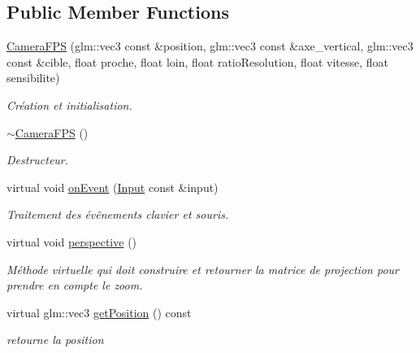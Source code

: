 \subsection*{Public Member Functions}
\begin{DoxyCompactItemize}
\item 
\hypertarget{classCameraFPS_a052e711986b70b0f34fb85f72c6818c9}{\hyperlink{classCameraFPS_a052e711986b70b0f34fb85f72c6818c9}{Camera\+F\+P\+S} (glm\+::vec3 const \&position, glm\+::vec3 const \&axe\+\_\+vertical, glm\+::vec3 const \&cible, float proche, float loin, float ratio\+Resolution, float vitesse, float sensibilite)}\label{classCameraFPS_a052e711986b70b0f34fb85f72c6818c9}

\begin{DoxyCompactList}\small\item\em Création et initialisation. \end{DoxyCompactList}\item 
\hypertarget{classCameraFPS_a2cf832c958d3e5a630539ea864b484dd}{\hyperlink{classCameraFPS_a2cf832c958d3e5a630539ea864b484dd}{$\sim$\+Camera\+F\+P\+S} ()}\label{classCameraFPS_a2cf832c958d3e5a630539ea864b484dd}

\begin{DoxyCompactList}\small\item\em Destructeur. \end{DoxyCompactList}\item 
\hypertarget{classCameraFPS_a1a051bc9f334ec12dc43fa16f6dd204c}{virtual void \hyperlink{classCameraFPS_a1a051bc9f334ec12dc43fa16f6dd204c}{on\+Event} (\hyperlink{classInput}{Input} const \&input)}\label{classCameraFPS_a1a051bc9f334ec12dc43fa16f6dd204c}

\begin{DoxyCompactList}\small\item\em Traitement des évênements clavier et souris. \end{DoxyCompactList}\item 
\hypertarget{classCameraFPS_a09b8ff24683ec75c107fce3e502eea1f}{virtual void \hyperlink{classCameraFPS_a09b8ff24683ec75c107fce3e502eea1f}{perspective} ()}\label{classCameraFPS_a09b8ff24683ec75c107fce3e502eea1f}

\begin{DoxyCompactList}\small\item\em Méthode virtuelle qui doit construire et retourner la matrice de projection pour prendre en compte le zoom. \end{DoxyCompactList}\item 
\hypertarget{classCameraFPS_a46be704d8fc6c8c25f9e6d093916affb}{virtual glm\+::vec3 \hyperlink{classCameraFPS_a46be704d8fc6c8c25f9e6d093916affb}{get\+Position} () const }\label{classCameraFPS_a46be704d8fc6c8c25f9e6d093916affb}

\begin{DoxyCompactList}\small\item\em retourne la position \end{DoxyCompactList}\end{DoxyCompactItemize}
